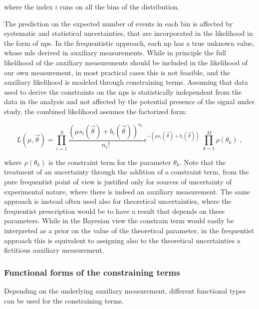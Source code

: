 \noindent where the index $i$ runs on all the bins of the distribution.

The prediction on the expected number of events in each bin is affected by systematic and statistical uncertainties, that are incorporated in the likelihood in the form of \glspl{np}. 
In the frequentistic approach, each \gls{np} has a true unknown value, whose \gls{mle} derived in auxiliary measurements. 
While in principle the full likelihood of the auxiliary measurements should be included in the likelihood of our own measurement, 
in most practical cases this is not feasible, and the auxiliary likelihood is modeled through constraining terms. 
Assuming that data used to derive the constraints on the \glspl{np} is statistically independent from the data in the analysis and not affected by the potential presence of the signal under study, the combined likelihood assumes the factorized form:

\begin{equation}
\label{eq:stat:lik_sys}
L(\mu, \vec{\theta}) =
\prod_{i=1}^N \frac{ (\mu s_{i}(\vec{\theta}) +
b_{i}(\vec{\theta}) )^{n_{i}} }{ n_{i}! }
e^{- (\mu s_{i}(\vec{\theta}) + b_{i}(\vec{\theta})) }   \;
\prod_{k=1}^M \rho( \theta_k) \; ,
\end{equation}

\noindent where $\rho( \theta_k)$ is the constraint term for the parameter $\theta_k$. Note that the treatment of an uncertainty through the addition of a constraint term, from the pure frequentist point of view is justified only for sources of uncertainty of experimental nature, where there is indeed an auxiliary measurement. The same approach is instead often used also for theoretical uncertainties, where the frequentist prescription would be to have a result that depends on these parameters. While in the Bayesian view the constrain term would easily be interpreted as a prior on the value of the theoretical parameter, in the frequentist approach this is equivalent to assigning also to the theoretical uncertainties a fictitious auxiliary measurement. 


\subsubsection*{Functional forms of the constraining terms}

Depending on the underlying auxiliary measurement, different functional types can be used for the constraining terms.

